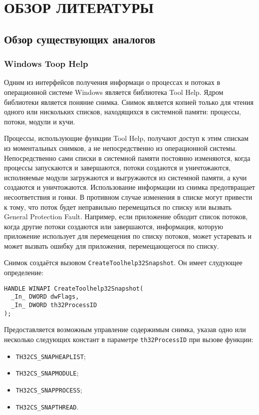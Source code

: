 \section{ОБЗОР ЛИТЕРАТУРЫ}
\label{sec:domain}

\subsection{Обзор существующих аналогов}
\label{sub:domain:analogs}

\subsubsection{Windows Toop Help}
\label{sub:domain:analogs:windows}

Одним из интерфейсов получения информаци о процессах и потоках в операционной
системе Windows является библиотека Tool Help\cite{tool_help_article}. Ядром
библиотеки является поняние снимка. Снимок является копией только для чтения
одного или нискольких списков, находящихся в системной памяти:
процессы, потоки, модули и кучи.

Процессы, использующие функции Tool Help, получают доступ к этим спискам из
моментальных снимков, а не непосредственно из операционной системы.
Непосредственно сами списки в системной памяти постоянно изменяются, когда
процессы запускаются и завершаются, потоки создаются и уничтожаются, исполняемые
модули загружаются и выгружаются из системной памяти, а кучи создаются и
уничтожаются. Использование информации из снимка предотвращает несоответствия и
гонки. В противном случае изменения в списке могут привести к тому, что поток
будет неправильно перемещаться по списку или вызвать General Protection Fault.
Например, если приложение обходит список потоков, когда другие потоки создаются
или завершаются, информация, которую приложение использует для перемещения по
списку потоков, может устаревать и может вызвать ошибку для приложения,
перемещающегося по списку.

Снимок создаётся вызовом \texttt{CreateToolhelp32Snapshot}. Он имеет слудующее
определение\cite{win_tool_help}:

\medskip
\begin{lstlisting}[style=cstyle]
HANDLE WINAPI CreateToolhelp32Snapshot(
  _In_ DWORD dwFlags,
  _In_ DWORD th32ProcessID
);
\end{lstlisting}
\medskip

Предоставляется возможным управление содержимым снимка, указав одно или
несколько следующих констант в параметре \texttt{th32ProcessID} при вызове
функции:
\begin{itemize}
\item \texttt{TH32CS\_SNAPHEAPLIST};
\item \texttt{TH32CS\_SNAPMODULE};
\item \texttt{TH32CS\_SNAPPROCESS};
\item \texttt{TH32CS\_SNAPTHREAD}.
\end{itemize}

